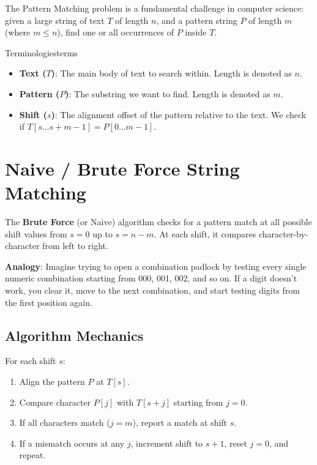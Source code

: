 \documentclass[11pt,a4paper]{article}
\begin{document}
The Pattern Matching problem is a fundamental challenge in computer science: given a large string of text $T$ of length $n$, and a pattern string $P$ of length $m$ (where $m \le n$), find one or all occurrences of $P$ inside $T$.

\begin{definition}{Terminologies}{terms}
  \begin{itemize}
    \item \textbf{Text ($T$)}: The main body of text to search within. Length is denoted as $n$.
    \item \textbf{Pattern ($P$)}: The substring we want to find. Length is denoted as $m$.
    \item \textbf{Shift ($s$)}: The alignment offset of the pattern relative to the text. We check if $T[s \dots s+m-1] = P[0 \dots m-1]$.
  \end{itemize}
\end{definition}

\section{Naive / Brute Force String Matching}

The \textbf{Brute Force} (or Naive) algorithm checks for a pattern match at all possible shift values from $s = 0$ up to $s = n - m$. At each shift, it compares character-by-character from left to right.

\begin{notebox}
  \textbf{Analogy}:
  Imagine trying to open a combination padlock by testing every single numeric combination starting from 000, 001, 002, and so on. If a digit doesn't work, you clear it, move to the next combination, and start testing digits from the first position again.
\end{notebox}

\subsection{Algorithm Mechanics}
For each shift $s$:
\begin{enumerate}
  \item Align the pattern $P$ at $T[s]$.
  \item Compare character $P[j]$ with $T[s+j]$ starting from $j = 0$.
  \item If all characters match ($j = m$), report a match at shift $s$.
  \item If a mismatch occurs at any $j$, increment shift to $s+1$, reset $j = 0$, and repeat.
\end{enumerate}
\end{document}
